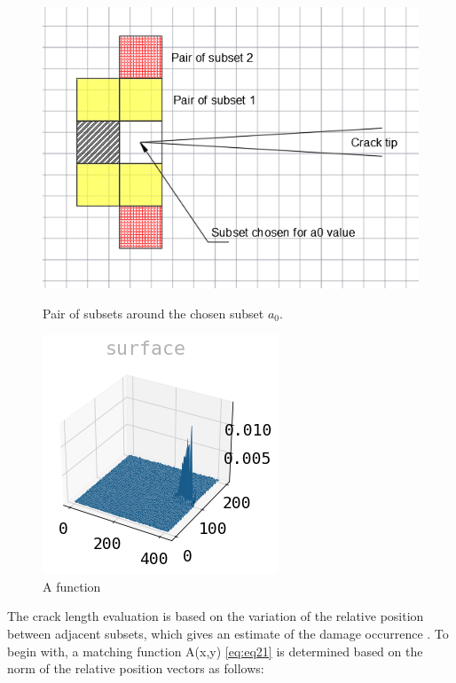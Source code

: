 \documentclass[3p,times,procedia]{elsarticle}
\begin{document}
\begin{figure}[htp]
	\begin{minipage}[c]{.46\linewidth}
		\centering
		\includegraphics[scale=0.4]{Figures/fig29bis}
		\caption{Pair of subsets around the chosen subset $a_0$.}
		\label{fig:fig29bis}
	\end{minipage}
	\hfill%
	\begin{minipage}[c]{.46\linewidth}
		\centering
		\includegraphics[scale=0.5]{Figures/A_function}
		\caption{A function}
		\label{fig:A_function}
	\end{minipage}
\end{figure}

The crack length evaluation is based on the variation of the relative position between adjacent subsets, which gives an estimate of the damage occurrence \citep{Xavieretal2014}. To begin with, a matching function A(x,y) \ref{eq:eq21} is determined based on the norm of the relative position vectors as follows:
\end{document}
